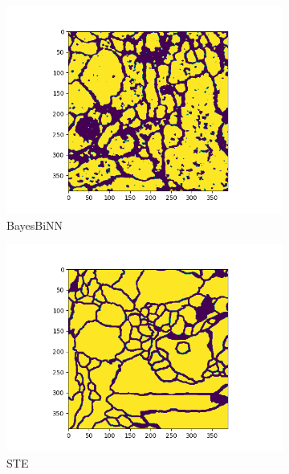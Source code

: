 \begin{figure}[h]
     \centering
     \begin{subfigure}[b]{0.3\textwidth}
         \centering
         \includegraphics[width=1.3\textwidth]{../openreview/figs/output_bayesbinn.png}
         \caption{BayesBiNN}
     \end{subfigure}
     \hfill
     \begin{subfigure}[b]{0.3\textwidth}
         \centering
         \includegraphics[width=1.3\textwidth]{../openreview/figs/output_ste.png}
         \caption{STE}
     \end{subfigure}
     \hfill
     \begin{subfigure}[b]{0.3\textwidth}
         \centering

\end{subfigure}
\end{figure}

